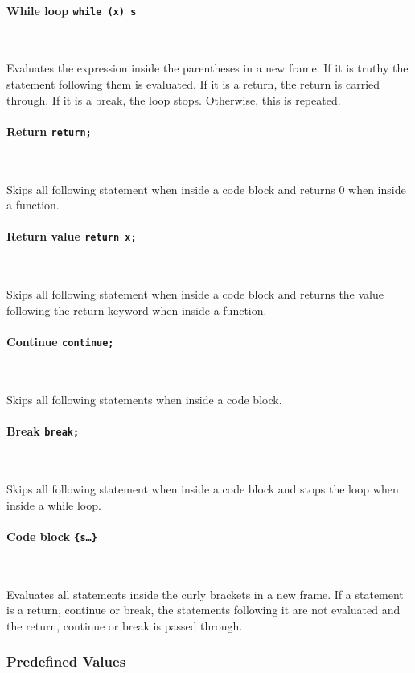 \documentclass[12pt, a4paper]{article}
\begin{document}
\paragraph{While loop \quad \texttt{while (x) s}} \

Evaluates the expression inside the parentheses in a new frame. If it is truthy the statement following them is evaluated. If it is a return, the return is carried through. If it is a break, the loop stops. Otherwise, this is repeated.

\paragraph{Return \quad \texttt{return;}} \

Skips all following statement when inside a code block and returns 0 when inside a function.

\paragraph{Return value \quad \texttt{return x;}} \

Skips all following statement when inside a code block and returns the value following the return keyword when inside a function.

\paragraph{Continue \quad \texttt{continue;}} \

Skips all following statements when inside a code block.

\paragraph{Break \quad \texttt{break;}} \

Skips all following statement when inside a code block and stops the loop when inside a while loop.

\paragraph{Code block \quad \texttt{\{s\ldots\}}} \

Evaluates all statements inside the curly brackets in a new frame. If a statement is a return, continue or break, the statements following it are not evaluated and the return, continue or break is passed through.

\subsubsection{Predefined Values}
\end{document}
